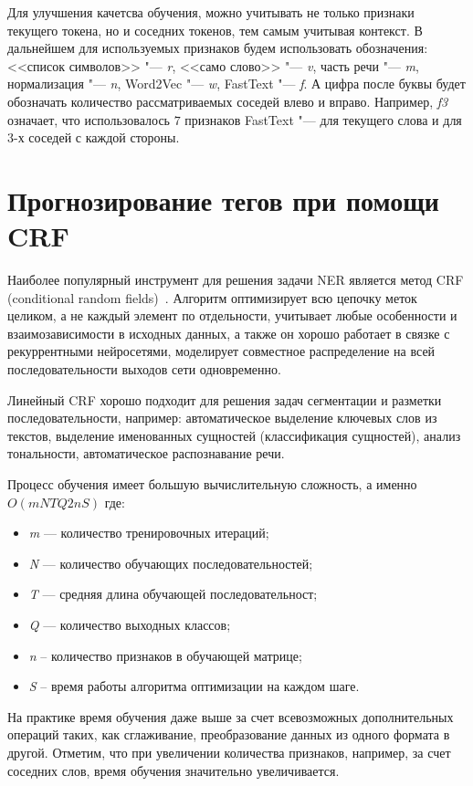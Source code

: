 \documentclass{csmathnotes}
\begin{document}
Для улучшения качетсва обучения, можно учитывать не только признаки текущего токена, но и соседних токенов, тем самым учитывая контекст.
В дальнейшем для используемых признаков будем использовать обозначения: <<список символов>> "--- \emph{r}, <<само слово>> "--- \emph{v}, часть речи "--- \emph{m}, нормализация "--- \emph{n}, Word2Vec "--- \emph{w}, FastText "--- \emph{f}.
А цифра после буквы будет обозначать количество рассматриваемых соседей влево и вправо.
Например, \emph{f3} означает, что использовалось $7$ признаков FastText "--- для текущего слова и для 3-х соседей с каждой стороны.

\section*{Прогнозирование тегов при помощи CRF}
Наиболее  популярный инструмент для решения задачи NER является метод CRF (conditional random fields)~\cite{HabrCRF}. 
Алгоритм оптимизирует всю цепочку меток целиком, а не каждый элемент по отдельности, учитывает любые особенности и взаимозависимости в исходных данных, а также он хорошо работает в связке с рекуррентными нейросетями, моделирует совместное распределение на всей последовательности выходов сети одновременно.

Линейный CRF хорошо подходит для решения задач сегментации и разметки последовательности,
например: автоматическое выделение ключевых слов из текстов, выделение именованных сущностей (классификация сущностей), анализ тональности, автоматическое распознавание речи.


Процесс обучения имеет большую вычислительную сложность, а именно $O(mNTQ2nS)$ где:
\begin{itemize}
    \item \emph{m} — количество тренировочных итераций;
    \item \emph{N} — количество обучающих последовательностей;
    \item \emph{T} — средняя длина обучающей последовательност;
    \item \emph{Q} — количество выходных классов;
    \item \emph{n} – количество признаков в обучающей матрице;
    \item \emph{S} – время работы алгоритма оптимизации на каждом шаге. 
\end{itemize}


На практике время обучения даже выше за счет всевозможных дополнительных операций таких, как сглаживание, преобразование данных из одного формата в другой.
Отметим, что при увеличении количества признаков, например, за счет соседних слов, время обучения значительно увеличивается. 
\end{document}
